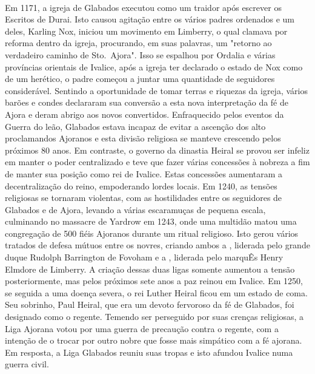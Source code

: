 %
%
\\
Em 1171, a igreja de Glabados executou  como um traidor após escrever os Escritos de Durai.
Isto causou agitação entre os vários padres ordenados e um deles, Karling Nox, iniciou um movimento em Limberry, o qual clamava por reforma dentro da igreja, procurando, em suas palavras, um "retorno ao verdadeiro caminho de Sto.~Ajora".
Isso se espalhou por Ordalia e várias províncias orientais de Ivalice, após a igreja ter declarado o estado de Nox como de um herético, o padre começou a juntar uma quantidade de seguidores considerável.
Sentindo a oportunidade de tomar terras e riquezas da igreja, vários barões e condes declararam sua conversão a esta nova interpretação da fé de Ajora e deram abrigo aos novos convertidos.
Enfraquecido pelos eventos da Guerra do leão, Glabados estava incapaz de evitar a ascenção dos alto proclamandos Ajoranos e esta divisão religiosa se manteve crescendo pelos próximos 80 anos. Em contraste, o governo da dinastia Heiral se provou ser infeliz em manter o poder centralizado e teve que fazer várias concessões à nobreza a fim de manter sua posição como rei de Ivalice.
Estas concessões aumentaram a decentralização do reino, empoderando lordes locais.
Em 1240, as tensões religiosas se tornaram violentas, com as hostilidades entre os seguidores de Glabados e de Ajora, levando a várias escaramuças de pequena escala, culminando no massacre de Yardrow em 1243, onde uma multidão matou uma congregação de 500 fiéis Ajoranos durante um ritual religioso.
Isto gerou vários tratados de defesa mútuos entre os novres, criando ambos a , liderada pelo grande duque Rudolph Barrington de Fovoham e a , liderada pelo marquÊs Henry Elmdore de Limberry.
A criação dessas duas ligas somente aumentou a tensão posteriormente, mas pelos próximos sete anos a paz reinou em Ivalice.
Em 1250, se seguida a uma doença severa, o rei Luther Heiral ficou em um estado de coma.
Seu sobrinho, Paul Heiral, que era um devoto fervoroso da fé de Glabados, foi designado como o regente.
Temendo ser perseguido por suas crenças religiosas, a Liga Ajorana votou por uma guerra de precaução contra o regente, com a intenção de o trocar por outro nobre que fosse mais simpático com a fé ajorana.
Em resposta, a Liga Glabados reuniu suas tropas e isto afundou Ivalice numa guerra civil.
%
\vfill
